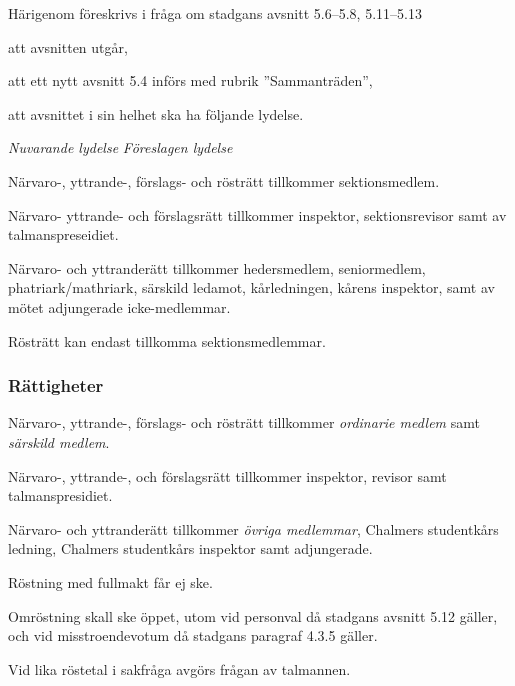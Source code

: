 \documentclass{article}
\newenvironment{lydelse}
    {\begin{paracol}{2}%
        \emph{Nuvarande lydelse}%
        \switchcolumn%
        \emph{Föreslagen lydelse}%
    \end{paracol}%
    \begin{enumerate}[label=\thesubsection.\arabic*]%
    \begin{paracol}{2}%
    }{\end{paracol}\end{enumerate}}
\begin{document}
Härigenom föreskrivs i fråga om stadgans avsnitt 5.6--5.8, 5.11--5.13
\begin{dels}
  \item att avsnitten utgår,
  \item att ett nytt avsnitt 5.4 införs med rubrik ''Sammanträden'',
  \item att avsnittet i sin helhet ska ha följande lydelse.
\end{dels}
\begin{lydelse}
  \setcounter{subsection}{6}
  \item Närvaro-, yttrande-, förslags- och rösträtt tillkommer sektionsmedlem.
  
  \item Närvaro- yttrande- och förslagsrätt tillkommer inspektor, sektionsrevisor samt av talmanspreseidiet.
  
  \item Närvaro- och yttranderätt tillkommer
  heders\-med\-lem, seniormedlem, phatriark/mathriark, särskild ledamot, kårledningen, kårens inspektor, samt av mötet adjungerade icke-medlemmar.

  \item Rösträtt kan endast tillkomma sektionsmedlemmar.
  
  \switchcolumn
  \setcounter{subsection}{4}
  \subsubsection*{Rättigheter}
  \item Närvaro-, yttrande-, förslags- och rösträtt tillkommer \emph{ordinarie medlem} samt \emph{särskild medlem}. \label{5.x:rösträtt}
  \item Närvaro-, yttrande-, och förslagsrätt tillkommer inspektor, revisor samt talmanspresidiet.
  \item Närvaro- och yttranderätt tillkommer \emph{övriga medlemmar}, Chalmers studentkårs ledning, Chalmers studentkårs inspektor samt adjungerade. \label{5.x:grundrätt}

  \switchcolumn*
  \setcounter{subsection}{11}
  \setcounter{enumi}{0}
  \item Röstning med fullmakt får ej ske.

  \item Omröstning skall ske öppet, utom vid personval då stadgans avsnitt 5.12 gäller, och vid misstroendevotum då stadgans paragraf 4.3.5 gäller.

  \item Vid lika röstetal i sakfråga avgörs frågan av talmannen.
  

\end{lydelse}
\end{document}
